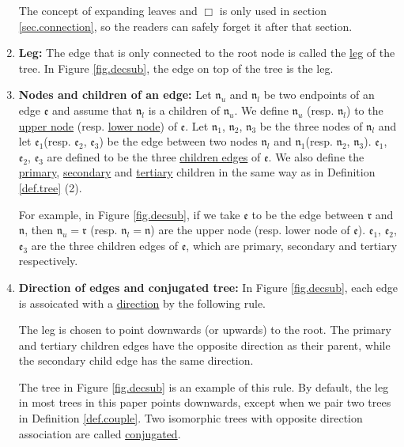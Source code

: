 \begin{defn}
\begin{enumerate}
 The concept of expanding leaves and $\Box$ is only used in section \ref{sec.connection}, so the readers can safely forget it after that section.

 \item \textbf{Leg:} The edge that is only connected to the root node is called the \underline{leg} of the tree. In Figure \ref{fig.decsub}, the edge on top of the tree is the leg.
 
 \item \textbf{Nodes and children of an edge:} Let $\mathfrak{n}_{u}$ and $\mathfrak{n}_{l}$ be two endpoints of an edge $\mathfrak{e}$ and assume that $\mathfrak{n}_{l}$ is a children of $\mathfrak{n}_{u}$. We define $\mathfrak{n}_{u}$ (resp. $\mathfrak{n}_{l}$) to the \underline{upper node} (resp. \underline{lower node}) of $\mathfrak{e}$. Let $\mathfrak{n}_1$, $\mathfrak{n}_2$, $\mathfrak{n}_3$ be the three nodes of $\mathfrak{n}_{l}$ and let $\mathfrak{e}_1$(resp. $\mathfrak{e}_2$, $\mathfrak{e}_3$) be the edge between two nodes $\mathfrak{n}_{l}$ and $\mathfrak{n}_1$(resp. $\mathfrak{n}_2$, $\mathfrak{n}_3$). $\mathfrak{e}_1$, $\mathfrak{e}_2$, $\mathfrak{e}_3$ are defined to be the three \underline{children edges} of $\mathfrak{e}$. We also define the \underline{primary}, \underline{secondary} and \underline{tertiary} children in the same way as in Definition \ref{def.tree} (2).
 
 For example, in Figure \ref{fig.decsub}, if we take $\mathfrak{e}$ to be the edge between $\mathfrak{r}$ and $\mathfrak{n}$, then $\mathfrak{n}_{u} = \mathfrak{r}$ (resp. $\mathfrak{n}_{l} = \mathfrak{n}$) are the upper node (resp. lower node of $\mathfrak{e}$). $\mathfrak{e}_1$, $\mathfrak{e}_2$, $\mathfrak{e}_3$ are the three children edges of $\mathfrak{e}$, which are primary, secondary and tertiary respectively.

 \item \textbf{Direction of edges and conjugated tree:} In Figure \ref{fig.decsub}, each edge is assoicated with a \underline{direction} by the following rule. 
 
 The leg is chosen to point downwards (or upwards) to the root. The primary and tertiary children edges have the opposite direction as their parent, while the secondary child edge has the same direction.

 The tree in Figure \ref{fig.decsub} is an example of this rule. By default, the leg in most trees in this paper points downwards, except when we pair two trees in Definition \ref{def.couple}. Two isomorphic trees with opposite direction association are called \underline{conjugated}.


\end{enumerate}
\end{defn}
